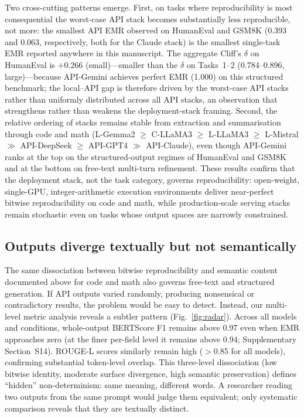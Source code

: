 \documentclass[sn-nature]{sn-jnl}
\begin{document}
Two cross-cutting patterns emerge.
First, on tasks where reproducibility is most consequential the worst-case API stack becomes substantially less reproducible, not more: the smallest API EMR observed on HumanEval and GSM8K (0.393 and 0.063, respectively, both for the Claude stack) is the smallest single-task EMR reported anywhere in this manuscript. The aggregate Cliff's $\delta$ on HumanEval is $+0.266$ (small)---smaller than the $\delta$ on Tasks~1--2 (0.784--0.896, large)---because API-Gemini achieves perfect EMR (1.000) on this structured benchmark; the local--API gap is therefore driven by the worst-case API stacks rather than uniformly distributed across all API stacks, an observation that strengthens rather than weakens the deployment-stack framing.
Second, the relative ordering of stacks remains stable from extraction and summarisation through code and math (L-Gemma2 $\geq$ C-LLaMA3 $\geq$ L-LLaMA3 $\geq$ L-Mistral $\gg$ API-DeepSeek $\geq$ API-GPT4 $\gg$ API-Claude), even though API-Gemini ranks at the top on the structured-output regimes of HumanEval and GSM8K and at the bottom on free-text multi-turn refinement.
These results confirm that the deployment stack, not the task category, governs reproducibility: open-weight, single-GPU, integer-arithmetic execution environments deliver near-perfect bitwise reproducibility on code and math, while production-scale serving stacks remain stochastic even on tasks whose output spaces are narrowly constrained.


\subsection{Outputs diverge textually but not semantically}\label{subsec:semantic}

The same dissociation between bitwise reproducibility and semantic content documented above for code and math also governs free-text and structured generation. If API outputs varied randomly, producing nonsensical or contradictory results, the problem would be easy to detect.
Instead, our multi-level metric analysis reveals a subtler pattern (Fig.~\ref{fig:radar}).
Across all models and conditions, whole-output BERTScore F1 remains above 0.97 even when EMR approaches zero (at the finer per-field level it remains above 0.94; Supplementary Section~S14).
ROUGE-L scores similarly remain high ($>$0.85 for all models), confirming substantial token-level overlap.
This three-level dissociation (low bitwise identity, moderate surface divergence, high semantic preservation) defines ``hidden'' non-determinism: same meaning, different words.
A researcher reading two outputs from the same prompt would judge them equivalent; only systematic comparison reveals that they are textually distinct.
\end{document}
